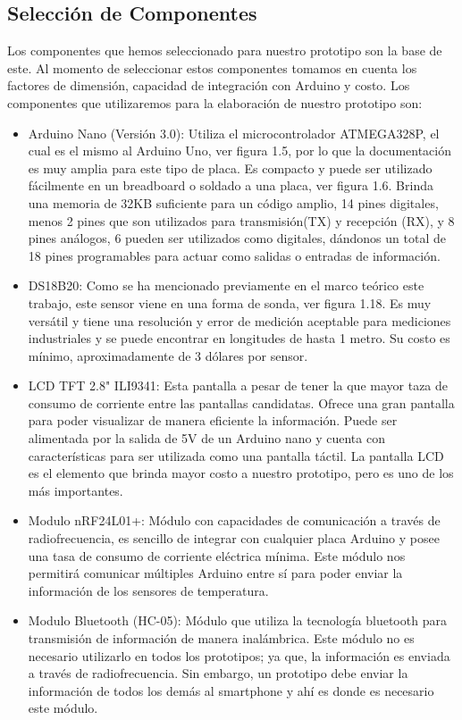 \subsection{Selección de Componentes}
\par 
Los componentes que hemos seleccionado para nuestro prototipo son la base de este. Al momento de seleccionar estos componentes tomamos en cuenta los factores de dimensión, capacidad de integración con Arduino y costo. Los componentes que utilizaremos para la elaboración de nuestro prototipo son:

\begin{itemize}
	\item Arduino Nano (Versión 3.0): Utiliza el microcontrolador ATMEGA328P, el cual es el mismo al Arduino Uno, ver figura 1.5, por lo que la documentación es muy amplia para este tipo de placa. Es compacto y puede ser utilizado fácilmente en un breadboard o soldado a una placa, ver figura 1.6. Brinda una memoria de 32KB suficiente para un código amplio, 14 pines digitales, menos 2 pines que son utilizados para transmisión(TX) y recepción (RX), y 8 pines análogos, 6 pueden ser utilizados como digitales, dándonos un total de 18 pines programables para actuar como salidas o entradas de información.
	
	\item DS18B20: Como se ha mencionado previamente en el marco teórico este trabajo, este sensor viene en una forma de sonda, ver figura 1.18. Es muy versátil y tiene una resolución y error de medición aceptable para mediciones industriales y se puede encontrar en longitudes de hasta 1 metro. Su costo es mínimo, aproximadamente de 3 dólares por sensor. 
	
	\item LCD TFT 2.8" ILI9341: Esta pantalla a pesar de tener la que mayor taza de consumo de corriente entre las pantallas candidatas. Ofrece una gran pantalla para poder visualizar de manera eficiente la información. Puede ser alimentada por la salida de 5V de un Arduino nano y cuenta con características para ser utilizada como una pantalla táctil. La pantalla LCD es el elemento que brinda mayor costo a nuestro prototipo, pero es uno de los más importantes.
	
	\item Modulo nRF24L01+: Módulo con capacidades de comunicación a través de radiofrecuencia, es sencillo de integrar con cualquier placa Arduino y posee una tasa de consumo de corriente eléctrica mínima. Este módulo nos permitirá comunicar múltiples Arduino entre sí para poder enviar la información de los sensores de temperatura.
	
	\item Modulo Bluetooth (HC-05): Módulo que utiliza la tecnología bluetooth para transmisión de información de manera inalámbrica. Este módulo no es necesario utilizarlo en todos los prototipos; ya que, la información es enviada a través de radiofrecuencia. Sin embargo, un prototipo debe enviar la información de todos los demás al smartphone y ahí es donde es necesario este módulo. 
	
\end{itemize}

